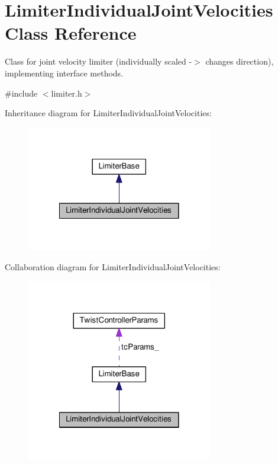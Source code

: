 \hypertarget{classLimiterIndividualJointVelocities}{\section{Limiter\-Individual\-Joint\-Velocities Class Reference}
\label{classLimiterIndividualJointVelocities}
}


Class for joint velocity limiter (individually scaled -\/$>$ changes direction), implementing interface methods.  




{\ttfamily \#include $<$limiter.\-h$>$}



Inheritance diagram for Limiter\-Individual\-Joint\-Velocities\-:
\nopagebreak
\begin{figure}[H]
\begin{center}
\leavevmode
\includegraphics[width=230pt]{classLimiterIndividualJointVelocities__inherit__graph}
\end{center}
\end{figure}


Collaboration diagram for Limiter\-Individual\-Joint\-Velocities\-:
\nopagebreak
\begin{figure}[H]
\begin{center}
\leavevmode
\includegraphics[width=230pt]{classLimiterIndividualJointVelocities__coll__graph}
\end{center}
\end{figure}
